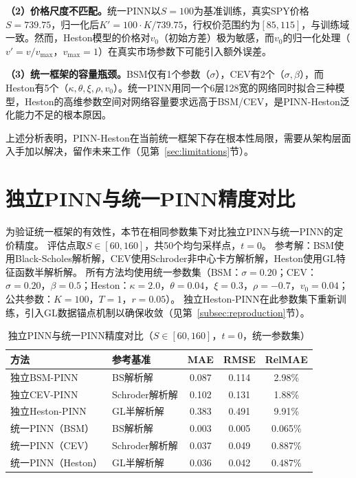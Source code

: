 \textbf{（2）价格尺度不匹配。}统一PINN以$S=100$为基准训练，真实SPY价格$S=739.75$，归一化后$K'=100\cdot K/739.75$，行权价范围约为$[85,115]$，与训练域一致。然而，Heston模型的价格对$v_0$（初始方差）极为敏感，而$v_0$的归一化处理（$v'=v/v_\text{max}$，$v_\text{max}=1$）在真实市场参数下可能引入额外误差。

\textbf{（3）统一框架的容量瓶颈。}BSM仅有1个参数（$\sigma$），CEV有2个（$\sigma,\beta$），而Heston有5个（$\kappa,\theta,\xi,\rho,v_0$）。统一PINN用同一个6层128宽的网络同时拟合三种模型，Heston的高维参数空间对网络容量要求远高于BSM/CEV，是PINN-Heston泛化能力不足的根本原因。

上述分析表明，PINN-Heston在当前统一框架下存在根本性局限，需要从架构层面入手加以解决，留作未来工作（见第~\ref{sec:limitations}节）。



\section{独立PINN与统一PINN精度对比}\label{sec:compare}

为验证统一框架的有效性，本节在相同参数集下对比独立PINN与统一PINN的定价精度。
评估点取$S\in[60,160]$，共50个均匀采样点，$t=0$。
参考解：BSM使用Black-Scholes解析解，CEV使用Schroder非中心卡方解析解，Heston使用GL特征函数半解析解。
所有方法均使用统一参数集（BSM：$\sigma=0.20$；CEV：$\sigma=0.20$，$\beta=0.5$；Heston：$\kappa=2.0$，$\theta=0.04$，$\xi=0.3$，$\rho=-0.7$，$v_0=0.04$；公共参数：$K=100$，$T=1$，$r=0.05$）。
独立Heston-PINN在此参数集下重新训练，引入GL数据锚点机制以确保收敛（见第~\ref{subsec:reproduction}节）。

\begin{table}[htbp]
  \centering
  \caption{独立PINN与统一PINN精度对比（$S\in[60,160]$，$t=0$，统一参数集）}
  \label{tab:compare}
  \begin{tabular}{llccc}
    \hline
    方法 & 参考基准 & MAE & RMSE & RelMAE \\
    \hline
    独立BSM-PINN   & BS解析解       & 0.087 & 0.114 & 2.98\% \\
    独立CEV-PINN   & Schroder解析解 & 0.102 & 0.131 & 1.88\% \\
    独立Heston-PINN & GL半解析解    & 0.383 & 0.491 & 9.91\% \\
    \hline
    统一PINN（BSM）   & BS解析解       & 0.003 & 0.005 & 0.065\% \\
    统一PINN（CEV）   & Schroder解析解 & 0.037 & 0.049 & 0.887\% \\
    统一PINN（Heston）& GL半解析解     & 0.036 & 0.042 & 0.487\% \\
    \hline
  \end{tabular}
\end{table}

